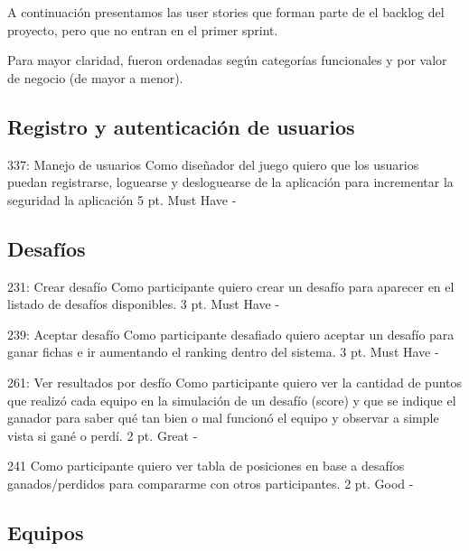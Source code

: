 A continuación presentamos las user stories que forman parte de el backlog del proyecto, pero que no entran en el primer sprint.

Para mayor claridad, fueron ordenadas según categorías funcionales y por valor de negocio (de mayor a menor).

\subsection{Registro y autenticación de usuarios}

\simplestory
{337: Manejo de usuarios}
{Como diseñador del juego quiero que los usuarios puedan registrarse, loguearse y desloguearse de la aplicación para incrementar la seguridad la aplicación}
{5 pt.}
{Must Have}
{-}

\subsection{Desaf\'ios}

\simplestory
{231: Crear desafío}
{Como participante quiero crear un desafío para aparecer en el listado de desafíos disponibles.}
{3 pt.}
{Must Have}
{-}

\vspace{1cm}

\simplestory
{239: Aceptar desafío}
{Como participante desafiado quiero aceptar un desafío para ganar fichas e ir aumentando el ranking dentro del sistema.}
{3 pt.}
{Must Have}
{-}

\vspace{1cm}

\simplestory
{261: Ver resultados por desfío}
{Como participante quiero ver la cantidad de puntos que realizó cada equipo en la simulación de un desafío (score) y que se indique el ganador para saber qué tan bien o mal funcionó el equipo y observar a simple vista si gané o perdí.
}
{2 pt.}
{Great}
{-}

\vspace{1cm}

\simplestory
{241}
{Como participante quiero ver tabla de posiciones en base a desafíos ganados/perdidos para compararme con otros participantes.}
{2 pt.}
{Good}
{-}

\vspace{1cm}

\subsection{Equipos}

